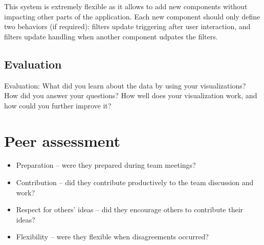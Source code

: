 \documentclass[a4paper,10pt]{article}
\begin{document}
This system is extremely flexible as it allows to add new components without impacting
other parts of the application. Each new component should only define two behaviors (if required):
filters update triggering after user interaction, and filters update handling when
another component udpates the filters.

\subsection{Evaluation}

Evaluation: What did you learn about the data by using your visualizations? How did you answer your questions? How well does your visualization work, and how could you further improve it?

\section{Peer assessment}

\begin{itemize}
  \item Preparation – were they prepared during team meetings?
  \item Contribution – did they contribute productively to the team discussion and work?
  \item Respect for others’ ideas – did they encourage others to contribute their ideas?
  \item Flexibility – were they flexible when disagreements occurred?
\end{itemize}

\setlength{\parskip}{0.1\baselineskip}

\newpage

\listoffigures
\end{document}

